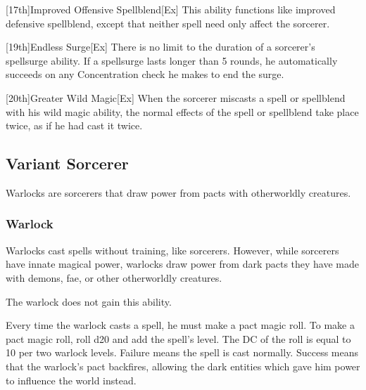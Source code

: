 [17th]{Improved Offensive Spellblend}[Ex]
This ability functions like improved defensive spellblend, except that neither spell need only affect the sorcerer.

[19th]{Endless Surge}[Ex]
There is no limit to the duration of a sorcerer's spellsurge ability.
If a spellsurge lasts longer than 5 rounds, he automatically succeeds on any Concentration check he makes to end the surge.

[20th]{Greater Wild Magic}[Ex]
When the sorcerer miscasts a spell or spellblend with his wild magic ability, the normal effects of the spell or spellblend take place twice, as if he had cast it twice.


\subsection{Variant Sorcerer}

Warlocks are sorcerers that draw power from pacts with otherworldly creatures.

\subsubsection{Warlock}

Warlocks cast spells without training, like sorcerers.
However, while sorcerers have innate magical power, warlocks draw power from dark pacts they have made with demons, fae, or other otherworldly creatures.

 The warlock does not gain this ability.

 Every time the warlock casts a spell, he must make a pact magic roll.
To make a pact magic roll, roll d20 and add the spell's level.
The DC of the roll is equal to 10  per two warlock levels.
Failure means the spell is cast normally.
Success means that the warlock's pact backfires, allowing the dark entities which gave him power to influence the world instead.

